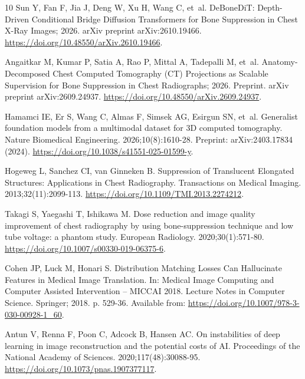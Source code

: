 \begin{thebibliography}{10}
Sun Y, Fan F, Jia J, Deng W, Xu H, Wang C, et~al. {DeBoneDiT}: Depth-Driven
  Conditional Bridge Diffusion Transformers for Bone Suppression in Chest
  {X}-Ray Images; 2026.
\newblock arXiv preprint arXiv:2610.19466.
\newblock \url{https://doi.org/10.48550/arXiv.2610.19466}.

Angaitkar M, Kumar P, Satia A, Rao P, Mittal A, Tadepalli M, et~al.
  Anatomy-Decomposed Chest Computed Tomography ({CT}) Projections as Scalable
  Supervision for Bone Suppression in Chest Radiographs; 2026.
\newblock Preprint.
\newblock arXiv preprint arXiv:2609.24937.
\newblock \url{https://doi.org/10.48550/arXiv.2609.24937}.

Hamamci IE, Er S, Wang C, Almas F, Simsek AG, Esirgun SN, et~al.
\newblock Generalist foundation models from a multimodal dataset for {3D}
  computed tomography.
\newblock Nature Biomedical Engineering. 2026;10(8):1610-28.
\newblock Preprint: arXiv:2403.17834 (2024).
\newblock \url{https://doi.org/10.1038/s41551-025-01599-y}.

Hogeweg L, Sanchez CI, van Ginneken B.
\newblock Suppression of Translucent Elongated Structures: Applications in
  Chest Radiography.
 Transactions on Medical Imaging. 2013;32(11):2099-113.
\newblock \url{https://doi.org/10.1109/TMI.2013.2274212}.

Takagi S, Yaegashi T, Ishikawa M.
\newblock Dose reduction and image quality improvement of chest radiography by
  using bone-suppression technique and low tube voltage: a phantom study.
\newblock European Radiology. 2020;30(1):571-80.
\newblock \url{https://doi.org/10.1007/s00330-019-06375-6}.

Cohen JP, Luck M, Honari S.
\newblock Distribution Matching Losses Can Hallucinate Features in Medical
  Image Translation.
\newblock In: Medical Image Computing and Computer Assisted Intervention --
  {MICCAI} 2018. Lecture Notes in Computer Science. Springer; 2018. p. 529-36.
\newblock Available from: \url{https://doi.org/10.1007/978-3-030-00928-1_60}.

Antun V, Renna F, Poon C, Adcock B, Hansen AC.
\newblock On instabilities of deep learning in image reconstruction and the
  potential costs of {AI}.
\newblock Proceedings of the National Academy of Sciences.
  2020;117(48):30088-95.
\newblock \url{https://doi.org/10.1073/pnas.1907377117}.


\end{thebibliography}
